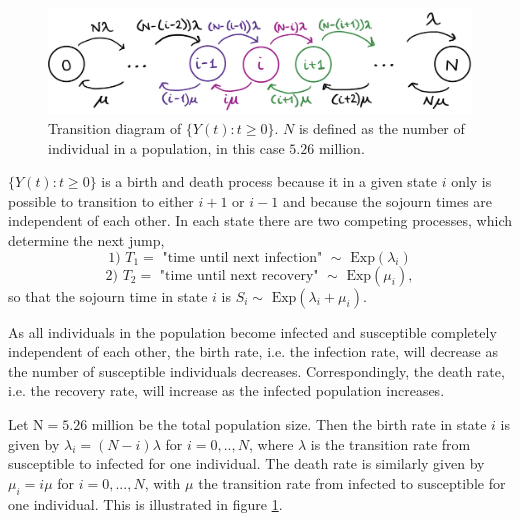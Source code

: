 \begin{figure}
    \centering
    \includegraphics[width=140mm]{1f_new.png}
    \caption{Transition diagram of $\{Y(t):t \geq 0 \}$. $N$ is defined as the number of individual in a population, in this case $5.26 \text{ million.}$}
    \label{transdiagramY}
\end{figure}
$\{Y(t):t \geq 0\}$ is a birth and death process because it in a given state $i$ only is possible to transition to either $i+1$ or $i-1$ and because the sojourn times are independent of each other. In each state there are two competing processes, which determine the next jump,
$$\text{1) } T_1  = \text{ "time until next infection" } \sim \text{ Exp}(\lambda_i)$$
$$\text{2) } T_2 = \text{ "time until next recovery" } \sim \text{ Exp}(\mu_i),$$
so that the sojourn time in state $i$ is $S_i \sim \text{ Exp}(\lambda_i +\mu_i)$.

As all individuals in the population become infected and susceptible completely independent of each other, the birth rate, i.e. the infection rate, will decrease as the number of susceptible individuals decreases. Correspondingly, the death rate, i.e. the recovery rate, will increase as the infected population increases. 

Let $\text{N}=5.26\text{ million}$ be the total population size. Then the birth rate in state $i$ is given by $\lambda_i=(N-i)\lambda$ for $i=0,..,N$, where $\lambda$ is the transition rate from susceptible to infected for one individual. The death rate is similarly given by $\mu_i = i\mu$ for $i=0,...,N$, with $\mu$ the transition rate from infected to susceptible for one individual. This is illustrated in figure \ref{transdiagramY}.

